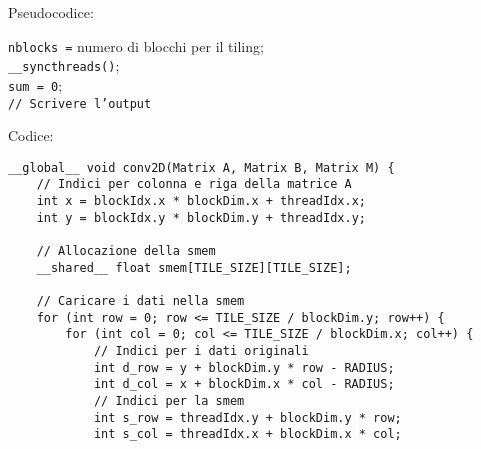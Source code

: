 \begin{questions}
\begin{solution}
        Pseudocodice:
        \begin{center}
            \begin{minipage}{.9\textwidth}
                \begin{tcolorbox}[
                    colback=white,
                    sharp corners,
                    boxrule=.3mm,
                    left=20pt,
                    top=0pt,
                    bottom=0pt,
                    colbacktitle=white,
                    coltitle=black
                    ]
                    \LinesNumbered
                    \begin{algorithm}[H]
                        \SetAlgoNoEnd
                        \texttt{nblocks =} numero di blocchi per il tiling;\\
                        \texttt{\_\_syncthreads()}; \\
                        \texttt{sum = 0}; \\
                        \texttt{// Scrivere l'output}
                    \end{algorithm}
                \end{tcolorbox}
            \end{minipage}
        \end{center}
        
        Codice:
        \begin{verbatim}
__global__ void conv2D(Matrix A, Matrix B, Matrix M) {
    // Indici per colonna e riga della matrice A
    int x = blockIdx.x * blockDim.x + threadIdx.x;
    int y = blockIdx.y * blockDim.y + threadIdx.y;
    
    // Allocazione della smem
    __shared__ float smem[TILE_SIZE][TILE_SIZE];
    
    // Caricare i dati nella smem
    for (int row = 0; row <= TILE_SIZE / blockDim.y; row++) {
        for (int col = 0; col <= TILE_SIZE / blockDim.x; col++) {
            // Indici per i dati originali
            int d_row = y + blockDim.y * row - RADIUS;
            int d_col = x + blockDim.x * col - RADIUS;
            // Indici per la smem
            int s_row = threadIdx.y + blockDim.y * row;
            int s_col = threadIdx.x + blockDim.x * col;
            

\end{verbatim}
\end{solution}
\end{questions}
